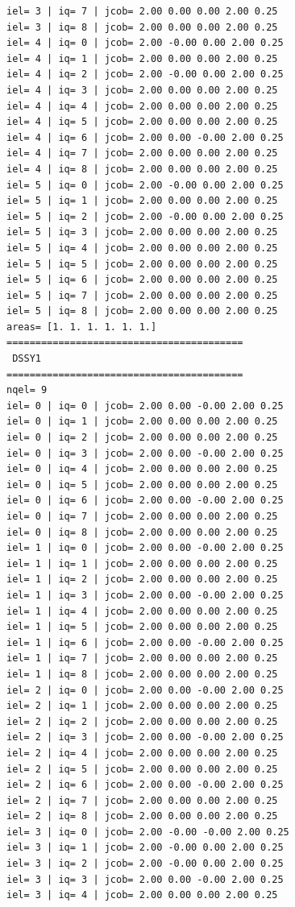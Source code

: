\begin{tiny}
\begin{verbatim}
iel= 3 | iq= 7 | jcob= 2.00 0.00 0.00 2.00 0.25
iel= 3 | iq= 8 | jcob= 2.00 0.00 0.00 2.00 0.25
iel= 4 | iq= 0 | jcob= 2.00 -0.00 0.00 2.00 0.25
iel= 4 | iq= 1 | jcob= 2.00 0.00 0.00 2.00 0.25
iel= 4 | iq= 2 | jcob= 2.00 -0.00 0.00 2.00 0.25
iel= 4 | iq= 3 | jcob= 2.00 0.00 0.00 2.00 0.25
iel= 4 | iq= 4 | jcob= 2.00 0.00 0.00 2.00 0.25
iel= 4 | iq= 5 | jcob= 2.00 0.00 0.00 2.00 0.25
iel= 4 | iq= 6 | jcob= 2.00 0.00 -0.00 2.00 0.25
iel= 4 | iq= 7 | jcob= 2.00 0.00 0.00 2.00 0.25
iel= 4 | iq= 8 | jcob= 2.00 0.00 0.00 2.00 0.25
iel= 5 | iq= 0 | jcob= 2.00 -0.00 0.00 2.00 0.25
iel= 5 | iq= 1 | jcob= 2.00 0.00 0.00 2.00 0.25
iel= 5 | iq= 2 | jcob= 2.00 -0.00 0.00 2.00 0.25
iel= 5 | iq= 3 | jcob= 2.00 0.00 0.00 2.00 0.25
iel= 5 | iq= 4 | jcob= 2.00 0.00 0.00 2.00 0.25
iel= 5 | iq= 5 | jcob= 2.00 0.00 0.00 2.00 0.25
iel= 5 | iq= 6 | jcob= 2.00 0.00 0.00 2.00 0.25
iel= 5 | iq= 7 | jcob= 2.00 0.00 0.00 2.00 0.25
iel= 5 | iq= 8 | jcob= 2.00 0.00 0.00 2.00 0.25
areas= [1. 1. 1. 1. 1. 1.]
=========================================
 DSSY1
=========================================
nqel= 9
iel= 0 | iq= 0 | jcob= 2.00 0.00 -0.00 2.00 0.25
iel= 0 | iq= 1 | jcob= 2.00 0.00 0.00 2.00 0.25
iel= 0 | iq= 2 | jcob= 2.00 0.00 0.00 2.00 0.25
iel= 0 | iq= 3 | jcob= 2.00 0.00 -0.00 2.00 0.25
iel= 0 | iq= 4 | jcob= 2.00 0.00 0.00 2.00 0.25
iel= 0 | iq= 5 | jcob= 2.00 0.00 0.00 2.00 0.25
iel= 0 | iq= 6 | jcob= 2.00 0.00 -0.00 2.00 0.25
iel= 0 | iq= 7 | jcob= 2.00 0.00 0.00 2.00 0.25
iel= 0 | iq= 8 | jcob= 2.00 0.00 0.00 2.00 0.25
iel= 1 | iq= 0 | jcob= 2.00 0.00 -0.00 2.00 0.25
iel= 1 | iq= 1 | jcob= 2.00 0.00 0.00 2.00 0.25
iel= 1 | iq= 2 | jcob= 2.00 0.00 0.00 2.00 0.25
iel= 1 | iq= 3 | jcob= 2.00 0.00 -0.00 2.00 0.25
iel= 1 | iq= 4 | jcob= 2.00 0.00 0.00 2.00 0.25
iel= 1 | iq= 5 | jcob= 2.00 0.00 0.00 2.00 0.25
iel= 1 | iq= 6 | jcob= 2.00 0.00 -0.00 2.00 0.25
iel= 1 | iq= 7 | jcob= 2.00 0.00 0.00 2.00 0.25
iel= 1 | iq= 8 | jcob= 2.00 0.00 0.00 2.00 0.25
iel= 2 | iq= 0 | jcob= 2.00 0.00 -0.00 2.00 0.25
iel= 2 | iq= 1 | jcob= 2.00 0.00 0.00 2.00 0.25
iel= 2 | iq= 2 | jcob= 2.00 0.00 0.00 2.00 0.25
iel= 2 | iq= 3 | jcob= 2.00 0.00 -0.00 2.00 0.25
iel= 2 | iq= 4 | jcob= 2.00 0.00 0.00 2.00 0.25
iel= 2 | iq= 5 | jcob= 2.00 0.00 0.00 2.00 0.25
iel= 2 | iq= 6 | jcob= 2.00 0.00 -0.00 2.00 0.25
iel= 2 | iq= 7 | jcob= 2.00 0.00 0.00 2.00 0.25
iel= 2 | iq= 8 | jcob= 2.00 0.00 0.00 2.00 0.25
iel= 3 | iq= 0 | jcob= 2.00 -0.00 -0.00 2.00 0.25
iel= 3 | iq= 1 | jcob= 2.00 -0.00 0.00 2.00 0.25
iel= 3 | iq= 2 | jcob= 2.00 -0.00 0.00 2.00 0.25
iel= 3 | iq= 3 | jcob= 2.00 0.00 -0.00 2.00 0.25
iel= 3 | iq= 4 | jcob= 2.00 0.00 0.00 2.00 0.25

\end{verbatim}
\end{tiny}
